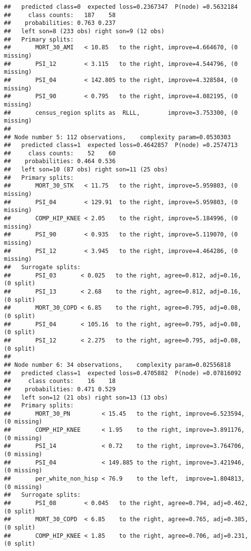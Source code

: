 \documentclass[
]{article}
\begin{document}
\begin{verbatim}
##   predicted class=0  expected loss=0.2367347  P(node) =0.5632184
##     class counts:   187    58
##    probabilities: 0.763 0.237 
##   left son=8 (233 obs) right son=9 (12 obs)
##   Primary splits:
##       MORT_30_AMI   < 10.85   to the right, improve=4.664670, (0 missing)
##       PSI_12        < 3.115   to the right, improve=4.544796, (0 missing)
##       PSI_04        < 142.805 to the right, improve=4.328584, (0 missing)
##       PSI_90        < 0.795   to the right, improve=4.082195, (0 missing)
##       census_region splits as  RLLL,        improve=3.753300, (0 missing)
## 
## Node number 5: 112 observations,    complexity param=0.0530303
##   predicted class=1  expected loss=0.4642857  P(node) =0.2574713
##     class counts:    52    60
##    probabilities: 0.464 0.536 
##   left son=10 (87 obs) right son=11 (25 obs)
##   Primary splits:
##       MORT_30_STK   < 11.75   to the right, improve=5.959803, (0 missing)
##       PSI_04        < 129.91  to the right, improve=5.959803, (0 missing)
##       COMP_HIP_KNEE < 2.05    to the right, improve=5.184996, (0 missing)
##       PSI_90        < 0.935   to the right, improve=5.119070, (0 missing)
##       PSI_12        < 3.945   to the right, improve=4.464286, (0 missing)
##   Surrogate splits:
##       PSI_03       < 0.025   to the right, agree=0.812, adj=0.16, (0 split)
##       PSI_13       < 2.68    to the right, agree=0.812, adj=0.16, (0 split)
##       MORT_30_COPD < 6.85    to the right, agree=0.795, adj=0.08, (0 split)
##       PSI_04       < 105.16  to the right, agree=0.795, adj=0.08, (0 split)
##       PSI_12       < 2.275   to the right, agree=0.795, adj=0.08, (0 split)
## 
## Node number 6: 34 observations,    complexity param=0.02556818
##   predicted class=1  expected loss=0.4705882  P(node) =0.07816092
##     class counts:    16    18
##    probabilities: 0.471 0.529 
##   left son=12 (21 obs) right son=13 (13 obs)
##   Primary splits:
##       MORT_30_PN         < 15.45   to the right, improve=6.523594, (0 missing)
##       COMP_HIP_KNEE      < 1.95    to the right, improve=3.891176, (0 missing)
##       PSI_14             < 0.72    to the right, improve=3.764706, (0 missing)
##       PSI_04             < 149.885 to the right, improve=3.421946, (0 missing)
##       per_white_non_hisp < 76.9    to the left,  improve=1.804813, (0 missing)
##   Surrogate splits:
##       PSI_08        < 0.045   to the right, agree=0.794, adj=0.462, (0 split)
##       MORT_30_COPD  < 6.85    to the right, agree=0.765, adj=0.385, (0 split)
##       COMP_HIP_KNEE < 1.85    to the right, agree=0.706, adj=0.231, (0 split)

\end{verbatim}
\end{document}
